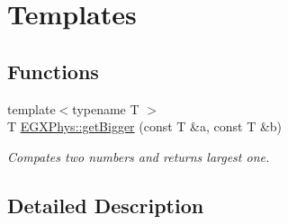 \hypertarget{group__templates}{}\section{Templates}
\label{group__templates}
\subsection*{Functions}
\begin{DoxyCompactItemize}
\item 
\mbox{\label{group__templates_ga33bfa46680adceb76677ef5086b6b879}} 
{\footnotesize template$<$typename T $>$ }\\T \hyperlink{group__templates_ga33bfa46680adceb76677ef5086b6b879}{E\+G\+X\+Phys\+::get\+Bigger} (const T \&a, const T \&b)
\begin{DoxyCompactList}\small\item\em Compates two numbers and returns largest one. \end{DoxyCompactList}\end{DoxyCompactItemize}


\subsection{Detailed Description}
